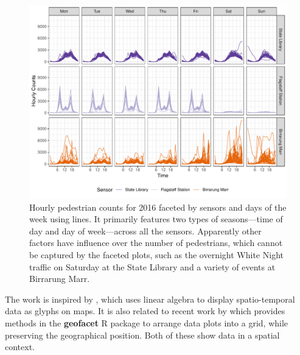 \documentclass[12pt]{article}
\begin{document}
\begin{figure}

{\centering \includegraphics[width=\textwidth]{figure/facet-time-1} 

}

\caption{Hourly pedestrian counts for 2016 faceted by sensors and days of the week using lines. It primarily features two types of seasons---time of day and day of week---across all the sensors. Apparently other factors have influence over the number of pedestrians, which cannot be captured by the faceted plots, such as the overnight White Night traffic on Saturday at the State Library and a variety of events at Birrarung Marr.}\label{fig:facet-time}
\end{figure}

The work is inspired by \citet{Wickham2012glyph}, which uses linear
algebra to display spatio-temporal data as glyphs on maps. It is also
related to recent work by \citet{R-geofacet} which provides methods in
the \textbf{geofacet} R package to arrange data plots into a grid, while
preserving the geographical position. Both of these show data in a
spatial context.
\end{document}
